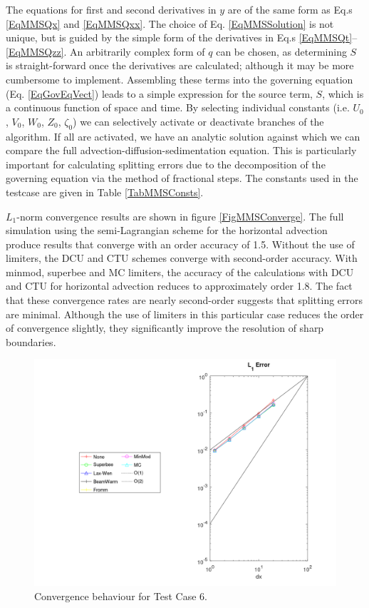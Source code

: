 The equations for first and second derivatives in $y$ are of the same form as
Eq.s \ref{EqMMSQx} and \ref{EqMMSQxx}.
The choice of Eq. \ref{EqMMSSolution} is not unique, but is guided by the simple form of
the derivatives in Eq.s \ref{EqMMSQt}--\ref{EqMMSQzz}.  An arbitrarily complex form of
$q$ can be chosen, as determining $S$ is straight-forward once the derivatives are
calculated; although it may be more cumbersome to implement. Assembling these terms into
the governing equation (Eq. \ref{EqGovEqVect}) leads to a simple expression for the source
term, $S$, which is a continuous function of space and time.  By selecting individual
constants (i.e. $U_0$, $V_0$, $W_0$, $Z_0$, $\zeta_0$) we can selectively activate or
deactivate branches of the algorithm.  If all are activated, we have an analytic solution
against which we can compare the full advection-diffusion-sedimentation equation.  This is
particularly important for calculating splitting errors due to the decomposition of the
governing equation via the method of fractional steps. The constants used in the testcase
are given in Table \ref{TabMMSConsts}.

$L_1$-norm convergence results are shown in figure \ref{FigMMSConverge}.  The full
simulation using the semi-Lagrangian scheme for the horizontal advection produce results
that converge with an order accuracy of 1.5.
Without the use of limiters, the DCU and CTU schemes converge with second-order accuracy.
With minmod, superbee and MC limiters, the accuracy of the calculations with DCU and CTU
for horizontal advection reduces to approximately order 1.8.  The fact that these
convergence rates are nearly second-order suggests that splitting errors are minimal.
Although the use of limiters in this particular case reduces the order of convergence
slightly, they significantly improve the resolution of sharp boundaries.

\begin{figure}[htbp]\vspace*{0cm}\hspace*{0cm}
\includegraphics[angle=0,scale=1.0]{Figures/Apx_Test/TC5_XY_Solution_Error_L1.png}
\parbox{15cm}{\caption{\label{FigTest_ConvTC6def}
Convergence behaviour for Test Case 6.
}}
\end{figure}


